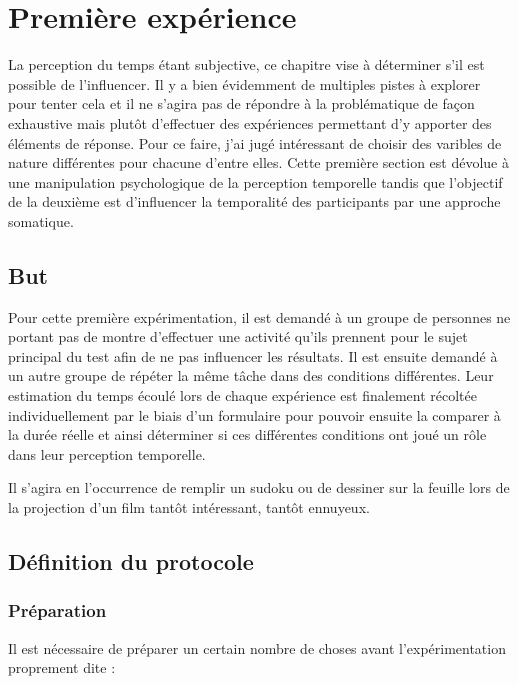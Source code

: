 \documentclass[12pt,fleqn,oneside,french,openany]{book} %
\begin{document}
\section{Première expérience} \label{sec:exp1}
La perception du temps étant subjective, ce chapitre vise à déterminer s'il est possible de l'influencer. Il y a bien évidemment de multiples pistes à explorer pour tenter cela et il ne s'agira pas de répondre à la problématique de façon exhaustive mais plutôt d'effectuer des expériences permettant d'y apporter des éléments de réponse. Pour ce faire, j'ai jugé intéressant de choisir des varibles de nature différentes pour chacune d'entre elles. Cette première section est dévolue à une manipulation psychologique de la perception temporelle tandis que l'objectif de la deuxième est d'influencer la temporalité des participants par une approche somatique.

\subsection{But} \label{ssec:but1}
Pour cette première expérimentation, il est demandé à un groupe de personnes ne portant pas de montre d'effectuer une activité qu'ils prennent pour le sujet principal du test afin de ne pas influencer les résultats. Il est ensuite demandé à un autre groupe de répéter la même tâche dans des conditions différentes. Leur estimation du temps écoulé lors de chaque expérience est finalement récoltée individuellement par le biais d'un formulaire pour pouvoir ensuite la comparer à la durée réelle et ainsi déterminer si ces différentes conditions ont joué un rôle dans leur perception temporelle.

Il s'agira en l'occurrence de remplir un sudoku ou de dessiner sur la feuille lors de la projection d'un film tantôt intéressant, tantôt ennuyeux. 


\subsection{Définition du protocole} \label{ssec:defProto1}

\subsubsection{Préparation} \label{sssec:preparation1}
Il est nécessaire de préparer un certain nombre de choses avant l'expérimentation proprement dite :
\end{document}
